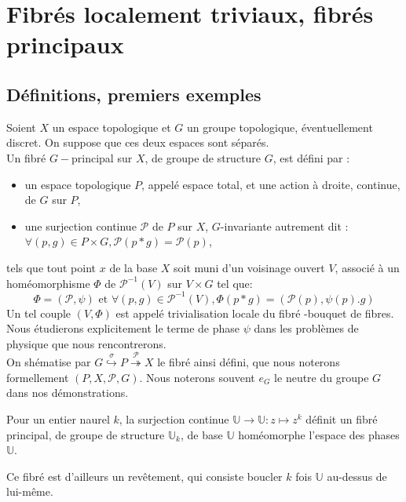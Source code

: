 \section{Fibr\'es localement triviaux, fibr\'es principaux}

\subsection{D\'efinitions, premiers exemples}

\begin{defi}
Soient $X$ un espace topologique et $G$ un groupe topologique, éventuellement discret. On suppose que ces deux espaces sont séparés.\\
Un fibré $G-$principal sur $X$, de groupe de structure $G$, est défini par :
\begin{itemize}
\item un espace topologique $P$, appelé espace total, et une action à droite, continue, de $G$ sur $P$,
\item une surjection continue $\mathcal{P}$ de $P$ sur $X$, $G$-invariante autrement dit : $\forall (p,g) \in P \times G , \mathcal{P} (p \ast g) = \mathcal{P} (p)$,
\end{itemize}
tels que tout point $x$ de la base $X$ soit muni d'un voisinage ouvert $V$, associé à un homéomorphisme $\Phi$ de $\mathcal{P}^{-1}(V)$ sur $V \times G$ tel que:
\[
\Phi = (\mathcal{P} , \psi)\text{ et }\forall (p,g) \in \mathcal{P}^{-1} (V) , \Phi(p \ast g) = (\mathcal{P}(p), \psi(p).g)
\]
Un tel couple $(V, \Phi)$ est appelé trivialisation locale du fibré -bouquet de fibres. Nous étudierons explicitement le terme de phase $\psi$ dans les problèmes de physique que nous rencontrerons.\\
On sh\'ematise par $G \overset{\sigma}{\hookrightarrow} P \overset{\mathcal{P}}{\twoheadrightarrow} X$ le fibré ainsi défini, %
que nous noterons formellement $(P,X,\mathcal{P},G)$. Nous noterons souvent $e_G$ le neutre du groupe $G$ dans nos démonstrations.
\end{defi}

\begin{exem}
Pour un entier naurel $k$, la surjection continue $\mathbb{U}\rightarrow\mathbb{U}:z\mapsto z^k$ d\'efinit un fibr\'e principal, %
de groupe de structure $\mathbb{U}_k$, de base $\mathbb{U}$ hom\'eomorphe  l'espace des phases $\mathbb{U}$.
\par
Ce fibr\'e est d'ailleurs un rev\^etement, qui consiste  boucler $k$ fois $\mathbb{U}$ au-dessus de lui-m\^eme.
\end{exem}

